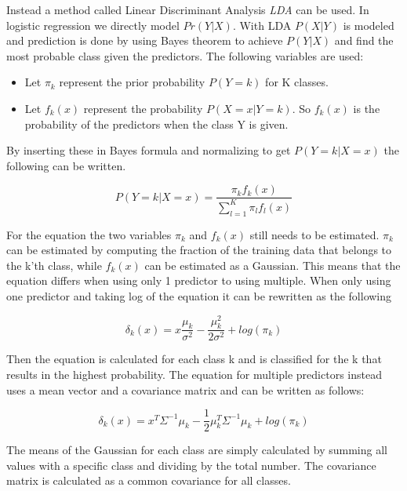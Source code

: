 Instead a method called Linear Discriminant Analysis \emph{LDA} can be used. In logistic regression we directly model $Pr(Y|X)$. With LDA $P(X|Y)$ is modeled and prediction is done by using Bayes theorem to achieve $P(Y|X)$ and find the most probable class given the predictors. The following variables are used:

\begin{itemize}
	\item Let $\pi_k$ represent the prior probability $P(Y=k)$ for K classes.
	\item Let $f_k(x)$ represent the probability $P(X=x|Y=k)$. So $f_k(x)$ is the probability of the predictors when the class Y is given.
\end{itemize} 

By inserting these in Bayes formula and normalizing to get $P(Y=k|X=x)$ the following can be written.

\begin{equation}
P(Y=k|X = x) = \dfrac{\pi_k f_k(x)}{\sum_{l=1}^{K} \pi_l f_l(x)}
\end{equation}

For the equation the two variables $\pi_k$ and $f_k(x)$ still needs to be estimated. $\pi_k$ can be estimated by computing the fraction of the training data that belongs to the k'th class, while $f_k(x)$ can be estimated as a Gaussian. This means that the equation differs when using only 1 predictor to using multiple. When only using one predictor and taking log of the equation it can be rewritten as the following

\begin{equation}
\delta_k(x) = x  \dfrac{\mu_k}{\sigma^2} - \dfrac{\mu_k^2}{2\sigma^2} + log(\pi_k)
\end{equation}

Then the equation is calculated for each class k and is classified for the k that results in the highest probability. The equation for multiple predictors instead uses a mean vector and a covariance matrix and can be written as follows:

\begin{equation}
\delta_k(x) = x^T \Sigma^{-1} \mu_k -  \frac{1}{2} \mu_k^{T} \Sigma^{-1} \mu_k + log (\pi_k)
\end{equation}

The means of the Gaussian for each class are simply calculated by summing all values with a specific class and dividing by the total number. The covariance matrix is calculated as a common covariance for all classes.

